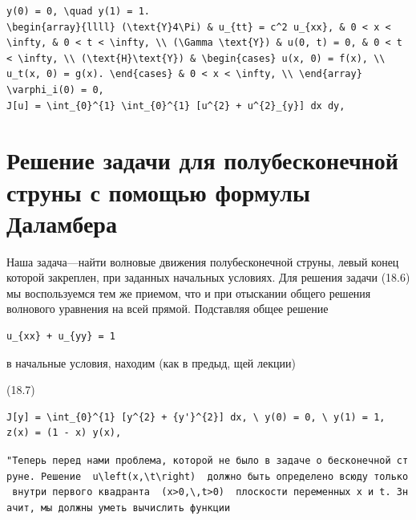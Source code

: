 \documentclass[
  ukrainian,
]{article}
\begin{document}
\begin{verbatim}
y(0) = 0, \quad y(1) = 1.
\begin{array}{llll} (\text{Y}4\Pi) & u_{tt} = c^2 u_{xx}, & 0 < x < \infty, & 0 < t < \infty, \\ (\Gamma \text{Y}) & u(0, t) = 0, & 0 < t < \infty, \\ (\text{H}\text{Y}) & \begin{cases} u(x, 0) = f(x), \\ u_t(x, 0) = g(x). \end{cases} & 0 < x < \infty, \\ \end{array}
\varphi_i(0) = 0,
J[u] = \int_{0}^{1} \int_{0}^{1} [u^{2} + u^{2}_{y}] dx dy,
\end{verbatim}

\section{Решение задачи для полубесконечной струны с помощью формулы
Даламбера}\label{ux440ux435ux448ux435ux43dux438ux435-ux437ux430ux434ux430ux447ux438-ux434ux43bux44f-ux43fux43eux43bux443ux431ux435ux441ux43aux43eux43dux435ux447ux43dux43eux439-ux441ux442ux440ux443ux43dux44b-ux441-ux43fux43eux43cux43eux449ux44cux44e-ux444ux43eux440ux43cux443ux43bux44b-ux434ux430ux43bux430ux43cux431ux435ux440ux430}

Наша задача---найти волновые движения полубесконечной струны, левый
конец которой закреплен, при заданных начальных условиях. Для решения
задачи (18.6) мы воспользуемся тем же приемом, что и при отыскании
общего решения волнового уравнения на всей прямой. Подставляя общее
решение

\begin{verbatim}
u_{xx} + u_{yy} = 1
\end{verbatim}

в начальные условия, находим (как в предыд, щей лекции)

(18.7)

\begin{verbatim}
J[y] = \int_{0}^{1} [y^{2} + {y'}^{2}] dx, \ y(0) = 0, \ y(1) = 1,
z(x) = (1 - x) y(x),
\end{verbatim}

\texttt{"Теперь\ перед\ нами\ проблема,\ которой\ не\ было\ в\ задаче\ о\ бесконечной\ струне.\ Решение\ \ \textquotesingle{}u\textbackslash{}left(x,\textbackslash{}t\textbackslash{}right)\textquotesingle{}\ \ должно\ быть\ определено\ всюду\ только\ внутри\ первого\ квадранта\ \ \textquotesingle{}(x\textgreater{}0,\textbackslash{},t\textgreater{}0)\textquotesingle{}\ \ плоскости\ переменных\ x\ и\ t.\ Значит,\ мы\ должны\ уметь\ вычислить\ функции}
\end{document}
